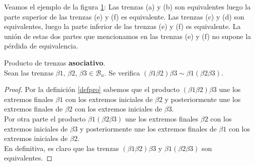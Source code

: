 \documentclass[14pt]{extarticle}
\begin{document}
\begin{figure}[h!]
   	\caption{}
   	\label{grupo1} 
   \end{figure}
   
   Veamos el ejemplo de la figura \ref{grupo1}: Las trenzas (a) y (b) son equivalentes luego la parte superior de las trenzas (e) y (f) es equivalente. Las trenzas (c) y (d) son equivalentes, luego la parte inferior de las trenzas (e) y (f) es equivalente. La unión de estas dos partes que mencionamos en las trenzas (e) y (f) no supone la pérdida de equivalencia. \\

\begin{pro} Producto de trenzas \textbf{asociativo}.\label{prodaso}\\
	Sean las trenzas $\beta1$, $\beta2$, $\beta3 \in \mathscr{B}_{n}$. Se verifica $(\beta1 \beta2) \beta3 \sim \beta1 (\beta2 \beta3)$.

	\begin{proof}	
		
		Por la definición \ref{defpro} sabemos que el producto $(\beta1 \beta2) \beta3$ une los extremos finales $ \beta1 $ con los extremos iniciales de $\beta2 $ y posteriormente une los extremos finales de $\beta2 $ con los extremos iniciales de $ \beta3 $. \\
		
		Por otra parte el producto $\beta1 (\beta2 \beta3)$ une los extremos finales $ \beta2 $ con los extremos iniciales de $\beta3 $ y posteriormente une los extremos finales de $\beta1 $ con los extremos iniciales de $ \beta2 $. \\
		
		En definitiva, es claro que las trenzas $(\beta1 \beta2) \beta3 $ y $ \beta1 (\beta2 \beta3)$ son equivalentes.
	\end{proof}
\end{pro}
\end{document}
